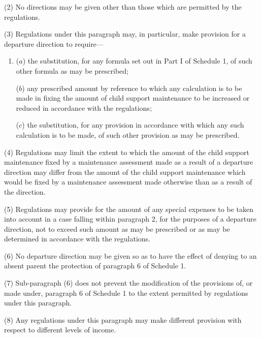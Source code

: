 \documentclass[12pt,a4paper]{article}
\begin{document}
{(2) No directions may be given other than those which are permitted by the regulations.

(3)
Regulations under this paragraph may, in particular, make provision for a departure direction to require---
\begin{enumerate}\item[]
($a$) the substitution, for any formula set out in Part I of Schedule 1, of such other
formula as may be prescribed;

($b$) any prescribed amount by reference to which any calculation is to be made
in fixing the amount of child support maintenance to be increased or reduced
in accordance with the regulations;

($c$) the substitution, for any provision in accordance with which any such
calculation is to be made, of such other provision as may be prescribed.
\end{enumerate}

(4)
Regulations may limit the extent to which the amount of the child support maintenance fixed by a maintenance assessment made as a result of a departure direction may differ from the amount of the child support maintenance which would be fixed by a maintenance assessment made otherwise than as a result of the direction.

(5)
Regulations may provide for the amount of any special expenses to be taken into account in a case falling within paragraph 2, for the purposes of a departure direction, not to exceed such amount as may be prescribed or as may be determined in accordance with the regulations.

(6)
No departure direction may be given so as to have the effect of denying to an absent parent the protection of paragraph 6 of Schedule 1.

(7)
Sub-paragraph (6) does not prevent the modification of the provisions of, or made under, paragraph 6 of Schedule 1 to the extent permitted by regulations under this paragraph.

(8)
Any regulations under this paragraph may make different provision with respect to different levels of income.

}
\end{document}
